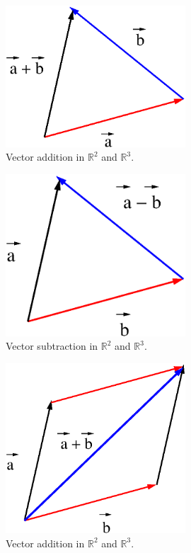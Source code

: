 \documentclass[color=black,11pt]{elegantpaper}
\begin{document}
\begin{figure}[htbp]
  \centering
  \includegraphics[width=0.6\textwidth]{xfig_stuff/additiontrangle.eps}
  \caption{Vector addition in $\mathbb{R}^2$ and $\mathbb{R}^3.$ }
  \label{fig:additiontriangle}
\end{figure}
\begin{figure}[htbp]
  \centering
  \includegraphics[width=0.6\textwidth]{xfig_stuff/vectorsubtraction.eps}
  \caption{Vector subtraction in $\mathbb{R}^2$ and $\mathbb{R}^3.$ }
  \label{fig:vectorsubtraction}
\end{figure}
\begin{figure}[htbp]
  \centering
  \includegraphics[width=0.6\textwidth]{xfig_stuff/additionparallelogram.eps}
  \caption{Vector  addition in $\mathbb{R}^2$ and $\mathbb{R}^3.$ }
  \label{fig:additionparallelogram}
\end{figure}
\end{document}
